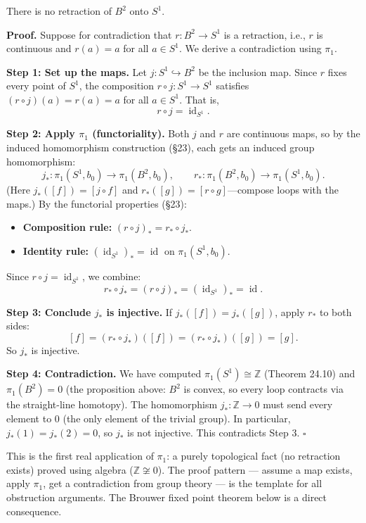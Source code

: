 \documentclass[11pt]{report}
\renewenvironment{proof}[1][Proof]{\noindent\textbf{#1.} }{\hfill$\square$\par\vspace{5pt}}
\begin{document}
\begin{thmbox}
There is no retraction of $B^2$ onto $S^1$.
\end{thmbox}

\begin{proof}
Suppose for contradiction that $r: B^2 \to S^1$ is a retraction, i.e., $r$ is continuous and $r(a) = a$ for all $a \in S^1$. We derive a contradiction using $\pi_1$.

\textbf{Step 1: Set up the maps.} Let $j: S^1 \hookrightarrow B^2$ be the inclusion map. Since $r$ fixes every point of $S^1$, the composition $r \circ j: S^1 \to S^1$ satisfies $(r \circ j)(a) = r(a) = a$ for all $a \in S^1$. That is,
\[r \circ j = \operatorname{id}_{S^1}.\]

\textbf{Step 2: Apply $\pi_1$ (functoriality).} Both $j$ and $r$ are continuous maps, so by the induced homomorphism construction (\S 23), each gets an induced group homomorphism:
\[j_*: \pi_1(S^1, b_0) \to \pi_1(B^2, b_0), \qquad r_*: \pi_1(B^2, b_0) \to \pi_1(S^1, b_0).\]
(Here $j_*([f]) = [j \circ f]$ and $r_*([g]) = [r \circ g]$---compose loops with the maps.) By the functorial properties (\S 23):
\begin{itemize}[nosep]
    \item \textbf{Composition rule:} $(r \circ j)_* = r_* \circ j_*$.
    \item \textbf{Identity rule:} $(\operatorname{id}_{S^1})_* = \operatorname{id}$ on $\pi_1(S^1, b_0)$.
\end{itemize}
Since $r \circ j = \operatorname{id}_{S^1}$, we combine:
\[r_* \circ j_* = (r \circ j)_* = (\operatorname{id}_{S^1})_* = \operatorname{id}.\]

\textbf{Step 3: Conclude $j_*$ is injective.} If $j_*([f]) = j_*([g])$, apply $r_*$ to both sides:
\[[f] = (r_* \circ j_*)([f]) = (r_* \circ j_*)([g]) = [g].\]
So $j_*$ is injective.

\textbf{Step 4: Contradiction.} We have computed $\pi_1(S^1) \cong \mathbb{Z}$ (Theorem 24.10) and $\pi_1(B^2) = 0$ (the proposition above: $B^2$ is convex, so every loop contracts via the straight-line homotopy). The homomorphism $j_*: \mathbb{Z} \to 0$ must send every element to $0$ (the only element of the trivial group). In particular, $j_*(1) = j_*(2) = 0$, so $j_*$ is not injective. This contradicts Step 3.
\end{proof}

\begin{rembox}
This is the first real application of $\pi_1$: a purely topological fact (no retraction exists) proved using algebra ($\mathbb{Z} \not\cong 0$). The proof pattern --- assume a map exists, apply $\pi_1$, get a contradiction from group theory --- is the template for all obstruction arguments. The Brouwer fixed point theorem below is a direct consequence.
\end{rembox}
\end{document}
